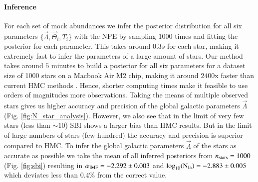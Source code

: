 \documentclass{aa}
\begin{document}
\paragraph{Inference}



For each set of mock abundances we infer the posterior distribution for all six parameters $\{\vec\Lambda,\vec\Theta_i,T_i\}$ with the NPE by sampling 1000 times and fitting the posterior for each parameter. This takes around $0.3s$ for each star, making it extremely fast to infer the parameters of a large amount of stars. 
Our method takes around $5$ minutes to build a posterior for all six parameters for a dataset size of 1000 stars on a Macbook Air M2 chip, making it around $2400$x faster than current HMC methods \citep[cf.][who needs $40$h for 200 stars with HMC]{Philcox_2019}. Hence, shorter computing times make it feasible to use orders of magnitudes more observations.
%
Taking the means of multiple observed stars gives us higher accuracy and precision of the global galactic parameters $\vec\Lambda$ (Fig. \ref{fig:N_star_analysis}). However, we also see that in the limit of very few stars (less than $\sim10$) SBI shows a larger bias than HMC results. But in the limit of large numbers of stars (few hundred) the accuracy and precision is superior compared to HMC.
%
To infer the global galactic parameters $\vec\Lambda$ of the stars as accurate as possible we take the mean of all inferred posteriors from $n_{\rm stars}=1000$ (Fig. \ref{fig:sbi}) resulting in $\alpha_{\rm IMF}=-2.292\pm0.003$ and $\log_{10}(\rm N_{Ia})=-2.883\pm0.005$ which deviates less than $0.4\%$ from the correct value.

\end{document}

